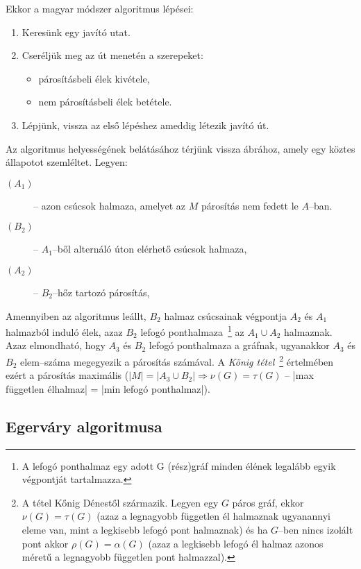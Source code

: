 Ekkor a magyar módszer algoritmus lépései:

\begin{enumerate}
  \item Keresünk egy javító utat.
  \item Cseréljük meg az út menetén a szerepeket:
  	\begin{itemize}
  	\item párosításbeli élek kivétele,
  	\item nem párosításbeli élek betétele. 
	\end{itemize}
  \item Lépjünk, vissza az első lépéshez ameddig létezik javító út.
\end{enumerate}

Az algoritmus helyességének belátásához térjünk vissza  ábrához,
amely egy köztes állapotot szemléltet. Legyen:
\begin{description}
  \item[$(A_1)$] -- azon csúcsok halmaza, amelyet az $M$ párosítás nem fedett le $A$--ban.
  \item[$(B_2)$] -- $A_1$--ből alternáló úton elérhető csúcsok halmaza,
  \item[$(A_2)$] -- $B_2$--hőz tartozó párosítás, 
\end{description}

Amennyiben az algoritmus leállt, $B_2$ halmaz csúcsainak végpontja $A_2$ és
$A_1$ halmazból induló élek, azaz $B_2$ lefogó ponthalmaza~\footnote{A lefogó
ponthalmaz egy adott G (rész)gráf minden élének legalább egyik végpontját tartalmazza.} az $A_1
\cup A_2$ halmaznak. Azaz elmondható, hogy $A_3$ és $B_2$ lefogó ponthalmaza a
gráfnak, ugyanakkor $A_3$ és $B_2$ elem--száma megegyezik a párosítás számával.
A \emph{König tétel}~\footnote{ A tétel Kőnig Dénestől származik. Legyen egy $G$
páros gráf, ekkor $\nu(G)=\tau(G)$ (azaz a legnagyobb független él halmaznak
ugyanannyi eleme van, mint a legkisebb lefogó pont halmaznak) és ha $G$--ben
nincs izolált pont akkor $\rho(G)=\alpha(G)$ (azaz a legkisebb lefogó él halmaz
azonos méretű a legnagyobb független pont halmazzal).} értelmében ezért a
párosítás maximális ($ |M|=|A_3 \cup B_2| \Rightarrow \nu(G) = \tau(G)$
-- |max független élhalmaz| = |min lefogó ponthalmaz|).

\subsection{Egerváry algoritmusa}

